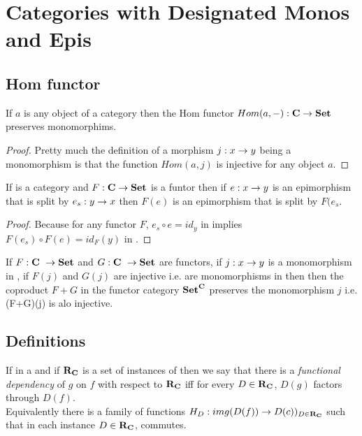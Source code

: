 \documentclass[12pt,a4paper]{article}
\theoremstyle{remark}
\begin{document}
\section{Categories with Designated Monos and Epis}
\newcommand{\pause}{}



\subsection{Hom functor}
\begin{lemma}
If $a$ is any object of a category \catcw then the Hom functor 
$Hom(a,-) : \textbf{C} \rightarrow \textbf{Set}$ preserves monomorphims.
\end{lemma}
\begin{proof}
Pretty much the definition of a morphism $j:x \rightarrow y$ being a monomorphism is that 
the function $Hom(a,j)$ is injective for any object $a$.
\end{proof}

\begin{lemma}
If \catcw is a category and $F: \textbf{C} \rightarrow \textbf{Set}$ is a funtor then
if $e:x \rightarrow y$ is an epimorphism that is split by $e_s: y \rightarrow x$
then $F(e)$ is an epimorphism that is split by $F(e_s$.
\end{lemma}
\begin{proof}
Because for any functor $F$, $e_s \circ e = id_y$ in \catcw implies 
$F(e_s) \circ F(e) = id_F(y)$ in \Set.
\end{proof}

\begin{lemma}
If $F: \textbf{C}\  \rightarrow \textbf{Set}$ and $G: \textbf{C}\  \rightarrow \textbf{Set}$ are functors,
if $j: x \rightarrow y$ is a monomorphism in \catc,
if $F(j)$ and $G(j)$ are injective i.e. are monomorphisms in \Set then
then the coproduct $F+G$ in the functor category $\textbf{Set}^{\textbf{C}}$ preserves the monomorphism
$j$ i.e. (F+G)(j) is alo injective.
\end{lemma}

\subsection{Definitions}
\begin{definition}
If \scalebox{0.9}{\fgsourcediagram} in a \catMEterm \catcw  and if $\textbf{R}_{\textbf{C}}$ is a set of instances of \catcw
then we say that there is a  \textit{functional dependency} of $g$ on $f$ with respect to $\textbf{R}_{\textbf{C}}$ iff
for every $D \in \textbf{R}_{\textbf{C}}$, $D(g)$ factors through $D(f)$. \\
\medskip
\pause Equivalently there is a family of  functions $H_D:img(D(f)) \rightarrow D(c))_{D \in \textbf{R}_{\textbf{C}}}$
such that in each instance $D \in \textbf{R}_{\textbf{C}}$,
 commutes.
\end{definition}
\end{document}
